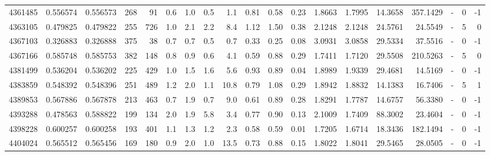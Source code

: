 \begin{tabular}{rrrrrrrrrrrrrrrrlrr}
   4361485 & 0.556574 &   0.556573 &  268 &   91 &      0.6 &      1.0 &     0.5 &      1.1 &       0.81 &        0.58 &        0.23 &  1.8663 &  1.7995 &   14.3658 &  357.1429 &             - &        0 &         -1 \\
   4363105 & 0.479825 &   0.479822 &  255 &  726 &      1.0 &      2.1 &     2.2 &      8.4 &       1.12 &        1.50 &        0.38 &  2.1248 &  2.1248 &   24.5761 &   24.5549 &             - &        5 &          0 \\
   4367103 & 0.326883 &   0.326888 &  375 &   38 &      0.7 &      0.7 &     0.5 &      0.7 &       0.33 &        0.25 &        0.08 &  3.0931 &  3.0858 &   29.5334 &   37.5516 &             - &        0 &         -1 \\
   4367166 & 0.585748 &   0.585753 &  382 &  148 &      0.8 &      0.9 &     0.6 &      4.1 &       0.59 &        0.88 &        0.29 &  1.7411 &  1.7120 &   29.5508 &  210.5263 &             - &        5 &          0 \\
   4381499 & 0.536204 &   0.536202 &  225 &  429 &      1.0 &      1.5 &     1.6 &      5.6 &       0.93 &        0.89 &        0.04 &  1.8989 &  1.9339 &   29.4681 &   14.5169 &             - &        0 &         -1 \\
   4383859 & 0.548392 &   0.548396 &  251 &  489 &      1.2 &      2.0 &     1.1 &     10.8 &       0.79 &        1.08 &        0.29 &  1.8942 &  1.8832 &   14.1383 &   16.7406 &             - &        5 &          1 \\
   4389853 & 0.567886 &   0.567878 &  213 &  463 &      0.7 &      1.9 &     0.7 &      9.0 &       0.61 &        0.89 &        0.28 &  1.8291 &  1.7787 &   14.6757 &   56.3380 &             - &        0 &         -1 \\
   4393288 & 0.478563 &   0.588822 &  199 &  134 &      2.0 &      1.9 &     5.8 &      3.4 &       0.77 &        0.90 &        0.13 &  2.1009 &  1.7409 &   88.3002 &   23.4604 &             - &        0 &         -1 \\
   4398228 & 0.600257 &   0.600258 &  193 &  401 &      1.1 &      1.3 &     1.2 &      2.3 &       0.58 &        0.59 &        0.01 &  1.7205 &  1.6714 &   18.3436 &  182.1494 &             - &        0 &         -1 \\
   4404024 & 0.565512 &   0.565456 &  169 &  180 &      0.9 &      2.0 &     1.0 &     13.5 &       0.73 &        0.88 &        0.15 &  1.8022 &  1.8041 &   29.5465 &   28.0505 &             - &        0 &         -1 \\

\end{tabular}
